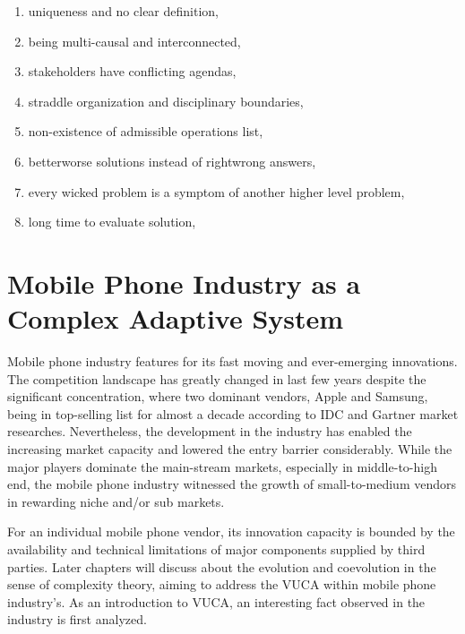 \documentclass[utf8,english]{gradu3}
\begin{document}
\begin{enumerate}
    \item uniqueness and no clear definition,
    \item being multi-causal and interconnected,
    \item stakeholders have conflicting agendas,
    \item straddle organization and disciplinary boundaries,
    \item non-existence of admissible operations list,
    \item better\/worse solutions instead of right\/wrong answers,
    \item every wicked problem is a symptom of another higher level problem,
    \item long time to evaluate solution,
\end{enumerate}

\chapter{Mobile Phone Industry as a Complex Adaptive System}

Mobile phone industry features for its fast moving and ever-emerging innovations. The competition landscape has greatly changed in last few years despite the significant concentration, where two dominant vendors, Apple and Samsung, being in top-selling list for almost a decade according to IDC and Gartner market researches. Nevertheless, the development in the industry has enabled the increasing market capacity and lowered the entry barrier considerably. While the major players dominate the main-stream markets, especially in middle-to-high end, the mobile phone industry witnessed the growth of small-to-medium vendors in rewarding niche and/or sub markets.

For an individual mobile phone vendor, its innovation capacity is bounded by the availability and technical limitations of major components supplied by third parties. Later chapters will discuss about the evolution and coevolution in the sense of complexity theory, aiming to address the VUCA within mobile phone industry's. As an introduction to VUCA, an interesting fact observed in the industry is first analyzed.
\end{document}
